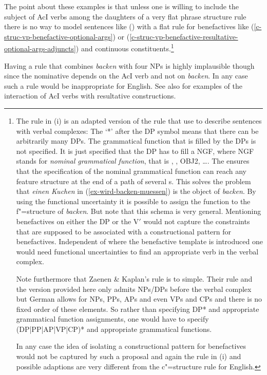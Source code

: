 The point about these examples is that unless one is willing to include the subject of AcI verbs
among the daughters of a very flat phrase structure rule there is no way to model sentences like
() with a flat rule for benefactives like (\ref{c-struc-vp-benefactive-optional-args}) or
(\ref{c-struc-vp-benefactive-resultative-optional-args-adjuncts}) and continuous
constituents.\footnote{\label{fn-zk-rule}
The rule in (i) is an adapted version of the rule that \citet[]{ZK2002a} use to
describe sentences with verbal complexes:
\ea
\label{lfg-vp-regel-zk}
\z
The `*' after the DP symbol means that there can be arbitrarily many DPs. The grammatical function
that is filled by the DPs is not specified. It is just specified that the DP has to fill a NGF,
where NGF stands for \emph{nominal grammatical function}, that is \subj, \obj, OBJ2, \ldots. The
\comp* ensures that the specification of the nominal grammatical function can reach any feature
structure at the end of a path of several \comp{}s. This solves the problem that \emph{einen Kuchen}
in (\ref{ex-wird-backen-muessen}) is the object of \emph{backen}. By using the functional
uncertainty it is possible to assign the \obj function to the f"=structure of \emph{backen}. But
note that this schema is very general. Mentioning benefactives on either the DP or the V$'$ would
not capture the constraints that are supposed to be associated with a constructional pattern for
benefactives. Independent of where the benefactive template is introduced one would need functional
uncertainties to find an appropriate verb in the verbal complex. 

Note furthermore that Zaenen \&
Kaplan's rule is to simple. Their rule and the version provided here only admits NPs/DPs before the
verbal complex but German allows for NPs, PPs, APs and even VPs and CPs and there is no fixed order of these
elements. So rather than specifying DP* and appropriate grammatical function assignments, one would
have to specify (DP|PP|AP|VP|CP)* and appropriate grammatical functions.

In any case the idea of isolating a constructional pattern for benefactives would
not be captured by such a proposal and again the rule in (i) and possible adaptions are very different from the c"=structure
rule for English.
}


Having a rule that combines \emph{backen} with four NPs is 
highly implausible though since the nominative depends on the AcI verb and not on \emph{backen}. In
any case such a rule would be inappropriate for English. See also  for examples of
the interaction of AcI verbs with resultative constructions.


